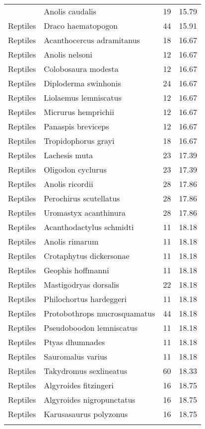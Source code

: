 \begin{longtable}{llcc}
{  Reptiles & Anolis caudalis &  19 & 15.79 \\ 
  Reptiles & Draco haematopogon &  44 & 15.91 \\ 
  Reptiles & Acanthocercus adramitanus &  18 & 16.67 \\ 
  Reptiles & Anolis nelsoni &  12 & 16.67 \\ 
  Reptiles & Colobosaura modesta &  12 & 16.67 \\ 
  Reptiles & Diploderma swinhonis &  24 & 16.67 \\ 
  Reptiles & Liolaemus lemniscatus &  12 & 16.67 \\ 
  Reptiles & Micrurus hemprichii &  12 & 16.67 \\ 
  Reptiles & Panaspis breviceps &  12 & 16.67 \\ 
  Reptiles & Tropidophorus grayi &  18 & 16.67 \\ 
  Reptiles & Lachesis muta &  23 & 17.39 \\ 
  Reptiles & Oligodon cyclurus &  23 & 17.39 \\ 
  Reptiles & Anolis ricordii &  28 & 17.86 \\ 
  Reptiles & Perochirus scutellatus &  28 & 17.86 \\ 
  Reptiles & Uromastyx acanthinura &  28 & 17.86 \\ 
  Reptiles & Acanthodactylus schmidti &  11 & 18.18 \\ 
  Reptiles & Anolis rimarum &  11 & 18.18 \\ 
  Reptiles & Crotaphytus dickersonae &  11 & 18.18 \\ 
  Reptiles & Geophis hoffmanni &  11 & 18.18 \\ 
  Reptiles & Mastigodryas dorsalis &  22 & 18.18 \\ 
  Reptiles & Philochortus hardeggeri &  11 & 18.18 \\ 
  Reptiles & Protobothrops mucrosquamatus &  44 & 18.18 \\ 
  Reptiles & Pseudoboodon lemniscatus &  11 & 18.18 \\ 
  Reptiles & Ptyas dhumnades &  11 & 18.18 \\ 
  Reptiles & Sauromalus varius &  11 & 18.18 \\ 
  Reptiles & Takydromus sexlineatus &  60 & 18.33 \\ 
  Reptiles & Algyroides fitzingeri &  16 & 18.75 \\ 
  Reptiles & Algyroides nigropunctatus &  16 & 18.75 \\ 
  Reptiles & Karusasaurus polyzonus &  16 & 18.75 \\ 
}
\end{longtable}
